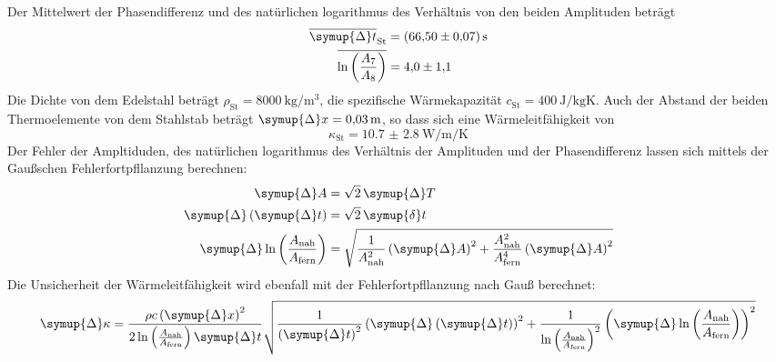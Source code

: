 Der Mittelwert der Phasendifferenz und des natürlichen logarithmus des Verhältnis von den beiden Amplituden beträgt
\begin{align}
  \overline{\symup{\Delta} t}_\text{St}                     & = \SI{66.50(7)}{\second} \\
  \overline{\ln \left (  \frac{A_7}{A_8} \right)} & = \num{4.0(11)}
\end{align}
Die Dichte von dem Edelstahl beträgt $\rho_\text{St} = \SI{8000}{\kilogram\per\cubic\metre}$, die spezifische Wärmekapazität 
$c_\text{St} = \SI{400}{\joule\per\kilogram\kelvin}$. Auch der Abstand der beiden Thermoelemente von dem Stahlstab
beträgt $\symup{\Delta} x = \SI{0.03}{\metre}$, so dass sich eine Wärmeleitfähigkeit von
\begin{equation}
  \kappa_\text{St} = \SI{10.7(28)}{\watt\per\metre\per\kelvin}
\end{equation} 
Der Fehler der Ampltiduden, des natürlichen logarithmus des Verhältnis der Amplituden und der Phasendifferenz 
lassen sich mittels der Gaußschen Fehlerfortpfllanzung berechnen:
\begin{align}
  \symup{\Delta} A                                                      &= \sqrt{2} \, \symup{\Delta} T \\
  \symup{\Delta} \left (\symup{\Delta} t \right )                       &= \sqrt{2} \, \symup{\delta} t \\
  \symup{\Delta} \ln \left ( \frac{A_\text{nah}}{A_\text{fern}} \right) &= 
  \sqrt{\frac{1}{A_\text{nah}^2} \left ( \symup{\Delta} A \right )^2 + 
  \frac{A_\text{nah}^2}{A_\text{fern}^4} \left ( \symup{\Delta} A \right ) ^2} 
\end{align}
Die Unsicherheit der Wärmeleitfähigkeit wird ebenfall mit der Fehlerfortpfllanzung nach Gauß berechnet:
\begin{equation} 
  \symup{\Delta} \kappa = \frac{\rho c \left ( \symup{\Delta} x \right )^2 }
  {2\ln \left ( \frac{A_\text{nah}}{A_\text{fern}} \right ) \symup{\Delta} t} 
  \sqrt{\frac{1}{\left( \symup{\Delta} t\right)^2}
  \left ( \symup{\Delta} \left ( \symup{\Delta} t \right ) \right )^2 + \frac{1}{ \ln \left ( \frac{A_\text{nah}}{A_\text{fern}} \right )^2}
 \left (  \symup{\Delta} \ln \left ( \frac{A_\text{nah}}{A_\text{fern}} \right ) \right )^2}
\end{equation}
